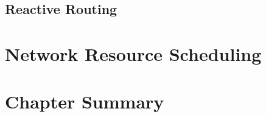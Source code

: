 \subsection{Reactive Routing}



\section{Network Resource Scheduling}


    
\section{Chapter Summary}

    